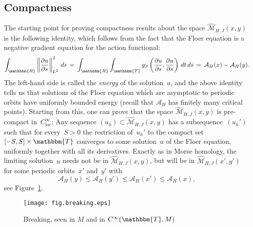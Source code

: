 \documentclass[12pt,twoside]{amsart}
\theoremstyle{plain}
\numberwithin{figure}{section}
\numberwithin{equation}{section}
\def\ca{{\mathcal A}}
\def\cm{{\mathcal M}}
\def\RR{\mathbbm{R}}
\def\TT{\mathbbm{T}}
\begin{document}
\subsection{Compactness} 
The starting point for proving compactness results about the space $\widehat{\cm}_{H,J}(x,y)$ is the following identity, which follows from the fact that the Floer equation is a negative gradient equation 
for the action functional:
\[
\int_{\RR} \left\| \frac{\partial u}{\partial s} \right\|_{L^2}^2\, ds \,=\, 
\int_{\RR} \int_{\TT} g_J\left( \frac{\partial u}{\partial s}, \frac{\partial u}{\partial s} \right) \, dt \,ds \,=\, \ca_H(x) - \ca_H(y).
\]
The left-hand side is called the {\em energy}\/ of the solution~$u$, and the above identity tells us that solutions of the Floer equation which are asymptotic to periodic orbits have uniformly bounded energy 
(recall that $\ca_H$ has finitely many critical points).
Starting from this, one can prove that the space $\widehat{\mathcal{\cm}}_{H,J}(x,y)$ is pre-compact 
in~$C^{\infty}_{\mathrm{loc}}$: Any sequence $(u_h) \subset \widehat{\cm}_{H,J}(x,y)$ 
has a subsequence~$(u_h')$ such that for every~$S>0$ the restriction of~$u_h'$ to the compact set 
$[-S,S] \times \TT$ converges to some solution~$u$ of the Floer equation, 
uniformly together with all its derivatives. 
Exactly as in Morse homology, the limiting solution~$u$ needs not be in $\widehat{\cm}_{H,J}(x,y)$, 
but will be in $\widehat{\cm}_{H,J}(x',y')$ for some periodic orbits~$x'$ and~$y'$ with
\[
\ca_H(y) \leqslant \ca_H(y') \leqslant \ca_H(x') \leqslant \ca_H(x),
\]
see Figure~\ref{fig.breaking}. 

\begin{figure}[h]   
 \begin{center}
  \leavevmode\texttt{[image: fig.breaking.eps]}
 \end{center}
 \caption{Breaking, seen in $M$ and in $C^\infty (\TT, M)$}  \label{fig.breaking}
\end{figure}
\end{document}
